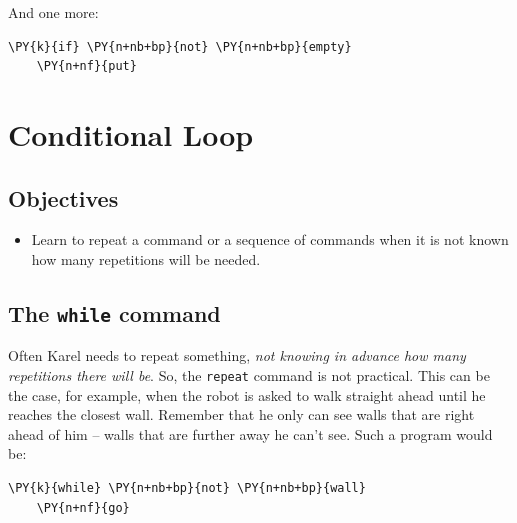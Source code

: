\noindent
And one more:\\
 
\begin{bbox}
\begin{Verbatim}[commandchars=\\\{\}]
\PY{k}{if} \PY{n+nb+bp}{not} \PY{n+nb+bp}{empty}
    \PY{n+nf}{put}
\end{Verbatim}
\end{bbox}
\vspace{6mm}

\noindent


\section{Conditional Loop} \label{sec:whilek}

\subsection{Objectives} 
 
\begin{itemize}
\item Learn to repeat a command or a sequence of commands when it is not known 
      how many repetitions will be needed.
\end{itemize}

\subsection{The {\tt while} command}

Often Karel needs to repeat something, {\em not knowing in advance how many repetitions
there will be}. So, the {\tt repeat} command is not practical. This can be the case, for example, 
when the robot is asked to walk straight ahead until he reaches the closest wall.
Remember that he only can see walls that are right ahead of him -- walls 
that are further away he can't see. Such a program would be:\\

\begin{bbox}
\begin{Verbatim}[commandchars=\\\{\}]
\PY{k}{while} \PY{n+nb+bp}{not} \PY{n+nb+bp}{wall}
    \PY{n+nf}{go}
\end{Verbatim}
\end{bbox}
\vspace{6mm}

